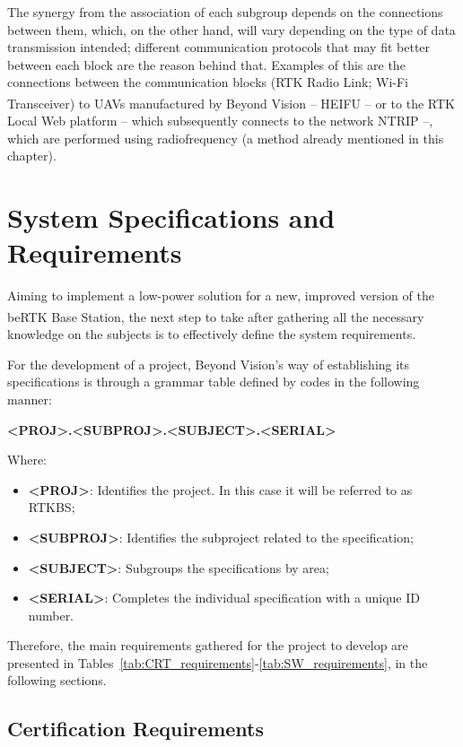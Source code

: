 The synergy from the association of each subgroup depends on the connections between them, which, on the other hand, will vary depending on the type of data transmission intended; different communication protocols that may fit better between each block are the reason behind that. Examples of this are the connections between the communication blocks (RTK Radio Link; Wi-Fi Transceiver) to UAVs manufactured by Beyond Vision -- HEIFU\textsuperscript{\textregistered} -- or to the RTK Local Web platform -- which subsequently connects to the network NTRIP --, which are performed using radiofrequency (a method already mentioned in this chapter).

\section{System Specifications and Requirements}\label{sec:II_Specs}

Aiming to implement a low-power solution for a new, improved version of the beRTK\textsuperscript{\textregistered} Base Station, the next step to take after gathering all the necessary knowledge on the subjects is to effectively define the system requirements.

For the development of a project, Beyond Vision's way of establishing its specifications is through a grammar table defined by codes in the following manner:

\begin{center}
	\textbf{<PROJ>.<SUBPROJ>.<SUBJECT>.<SERIAL>}
\end{center}
Where:
\begin{itemize}
	\item \textbf{<PROJ>}: Identifies the project. In this case it will be referred to as RTKBS;
	\item \textbf{<SUBPROJ>}: Identifies the subproject related to the specification;
	\item \textbf{<SUBJECT>}: Subgroups the specifications by area;
	\item \textbf{<SERIAL>}: Completes the individual specification with a unique ID number.
\end{itemize}

Therefore, the main requirements gathered for the project to develop are presented in Tables~\ref{tab:CRT_requirements}-\ref{tab:SW_requirements}, in the following sections.

\clearpage
\subsection{Certification Requirements}\label{II:CRT_requirements}

